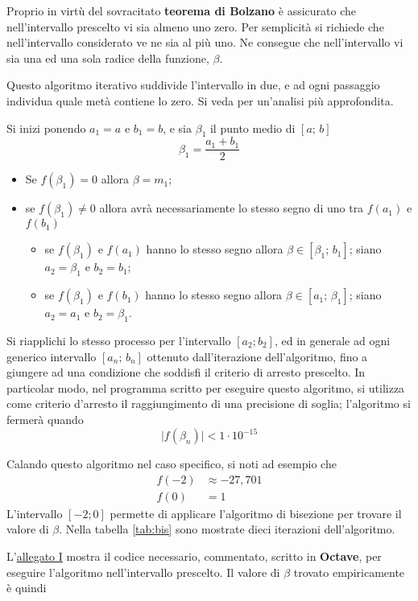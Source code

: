 Proprio in virtù del sovracitato \textbf{teorema di Bolzano} \parencite[vol. 4B, p. 1436]{blu:1}
è assicurato che nell'intervallo prescelto vi sia almeno uno zero. Per semplicità si richiede che nell'intervallo considerato ve ne sia al più uno. Ne consegue che nell'intervallo vi sia una ed una sola radice della funzione, $\beta$.

Questo algoritmo iterativo suddivide l'intervallo in due, e ad ogni passaggio individua quale metà contiene lo zero. Si veda \parencite[48-53]{num:an} per un'analisi più approfondita.

Si inizi ponendo $a_1=a$ e $b_1=b$, e sia $\beta_1$ il punto medio di $[a;\,b]$
\[
\beta_1=\frac{a_1+b_1}{2}
\]
\begin{itemize}
\item Se $f(\beta_1)=0$ allora $\beta=m_1$;
\item se $f(\beta_1)\neq0$ allora avrà necessariamente lo stesso segno di uno tra $f(a_1)$ e $f(b_1)$
\begin{itemize}
\item  se $f(\beta_1)$ e $f(a_1)$ hanno lo stesso segno allora $\beta\in [\beta_1;\,b_1]$; siano $a_2=\beta_1$ e $b_2=b_1$;
\item  se $f(\beta_1)$ e $f(b_1)$ hanno lo stesso segno allora $\beta\in [a_1;\,\beta_1]$; siano $a_2=a_1$ e $b_2=\beta_1$.
\end{itemize}
\end{itemize}
Si riapplichi lo stesso processo per l'intervallo $[a_2; b_2]$, ed in generale ad ogni generico intervallo $[a_n;\,b_n]$ ottenuto dall'iterazione dell'algoritmo, fino a giungere ad una condizione che soddisfi il criterio di arresto prescelto. In particolar modo, nel programma scritto per eseguire questo algoritmo, si utilizza come criterio d'arresto il raggiungimento di una precisione di soglia; l'algoritmo si fermerà quando
\[
\big|f(\beta_n)\big|<1\cdot 10^{-15}
\]

Calando questo algoritmo nel caso specifico, si noti ad esempio che 
\begin{align*}
f(-2)&\approx-27,701\\
f(0)&=1
\end{align*}
L'intervallo $[-2; 0]$ permette di applicare l'algoritmo di bisezione per trovare il valore di $\beta$. Nella tabella \ref{tab:bis} sono mostrate dieci iterazioni dell'algoritmo.

L'\hyperref[all:1]{allegato I} mostra il codice necessario, commentato, scritto in \textbf{Octave}, per eseguire l'algoritmo nell'intervallo prescelto. Il valore di $\beta$ trovato empiricamente è quindi

